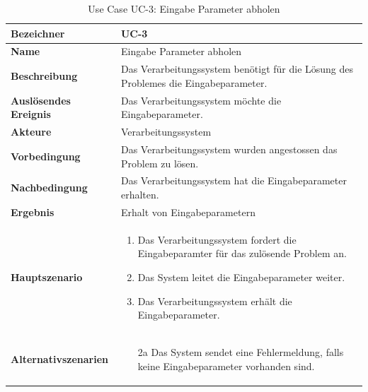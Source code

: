 \begin{table}[ht]
\centering
  \begin{tabular}{ l | p{10cm} }
	\hline
	\rowcolor{gray}
	\textbf{Bezeichner}	&	\textbf{UC-3}\\ \hline
	\textbf{Name}			&	Eingabe Parameter abholen\\ \hline
	\textbf{Beschreibung}	&	Das Verarbeitungssystem benötigt für die Lösung des Problemes die Eingabeparameter.\\ \hline
	\textbf{Auslösendes Ereignis}&	Das Verarbeitungssystem möchte die Eingabeparameter.\\ \hline
	\textbf{Akteure}		&	Verarbeitungssystem\\ \hline
	\textbf{Vorbedingung}	&	Das Verarbeitungssystem wurden angestossen das Problem zu lösen.\\ \hline
	\textbf{Nachbedingung}	&	Das Verarbeitungssystem hat die Eingabeparameter erhalten.\\ \hline
	\textbf{Ergebnis}		&	Erhalt von Eingabeparametern\\ \hline
	\textbf{Hauptszenario}	&	\begin{enumerate}
					\item Das Verarbeitungssystem fordert die Eingabeparamter für das zulösende Problem an.
					\item Das System leitet die Eingabeparameter weiter.
					\item Das Verarbeitungssystem erhält die Eingabeparameter.
					\end{enumerate}
					\\ \hline
	\textbf{Alternativszenarien}	&	\begin{enumerate}
					\item[2a] Das System sendet eine Fehlermeldung, falls keine Eingabeparameter vorhanden sind.
					\end{enumerate}
					\\ \hline
  \end{tabular}
   \caption{Use Case UC-3: Eingabe Parameter abholen}\label{table:use_case_3}
\end{table}


